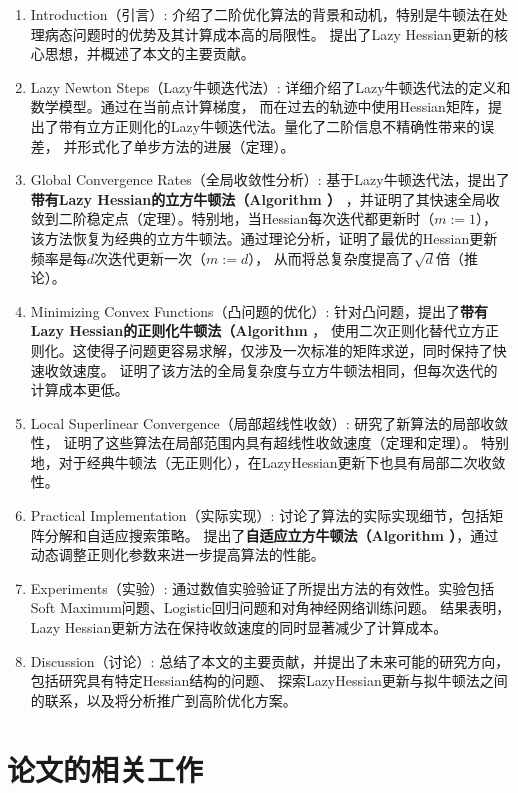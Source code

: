 \documentclass[a4paper,twoside,AutoFakeBold]{article}
\theoremstyle{definition}
\begin{document}
\begin{enumerate}
    \item Introduction（引言）: 介绍了二阶优化算法的背景和动机，特别是牛顿法在处理病态问题时的优势及其计算成本高的局限性。
	提出了Lazy Hessian更新的核心思想，并概述了本文的主要贡献。
	\item Lazy Newton Steps（Lazy牛顿迭代法）: 详细介绍了Lazy牛顿迭代法的定义和数学模型。通过在当前点计算梯度，
	而在过去的轨迹中使用Hessian矩阵，提出了带有立方正则化的Lazy牛顿迭代法。量化了二阶信息不精确性带来的误差，
	并形式化了单步方法的进展（定理）。
	\item Global Convergence Rates（全局收敛性分析）: 基于Lazy牛顿迭代法，提出了\textbf{带有Lazy Hessian的立方牛顿法（Algorithm ）}
	，并证明了其快速全局收敛到二阶稳定点（定理）。特别地，当Hessian每次迭代都更新时（\(m := 1\)），
	该方法恢复为经典的立方牛顿法。通过理论分析，证明了最优的Hessian更新频率是每\(d\)次迭代更新一次（\(m := d\)），
	从而将总复杂度提高了\(\sqrt{d}\)倍（推论）。
	\item Minimizing Convex Functions（凸问题的优化）: 针对凸问题，提出了\textbf{带有Lazy Hessian的正则化牛顿法（Algorithm }，
	使用二次正则化替代立方正则化。这使得子问题更容易求解，仅涉及一次标准的矩阵求逆，同时保持了快速收敛速度。
	证明了该方法的全局复杂度与立方牛顿法相同，但每次迭代的计算成本更低。
	\item Local Superlinear Convergence（局部超线性收敛）: 研究了新算法的局部收敛性，
	证明了这些算法在局部范围内具有超线性收敛速度（定理和定理）。
	特别地，对于经典牛顿法（无正则化），在LazyHessian更新下也具有局部二次收敛性。
	\item Practical Implementation（实际实现）: 讨论了算法的实际实现细节，包括矩阵分解和自适应搜索策略。
	提出了\textbf{自适应立方牛顿法（Algorithm ）}，通过动态调整正则化参数来进一步提高算法的性能。
	\item Experiments（实验）: 通过数值实验验证了所提出方法的有效性。实验包括Soft Maximum问题、Logistic回归问题和对角神经网络训练问题。
	结果表明，Lazy Hessian更新方法在保持收敛速度的同时显著减少了计算成本。
	\item Discussion（讨论）: 总结了本文的主要贡献，并提出了未来可能的研究方向，包括研究具有特定Hessian结构的问题、
	探索LazyHessian更新与拟牛顿法之间的联系，以及将分析推广到高阶优化方案。
\end{enumerate}
\newpage

\section{论文的相关工作}
\end{document}

